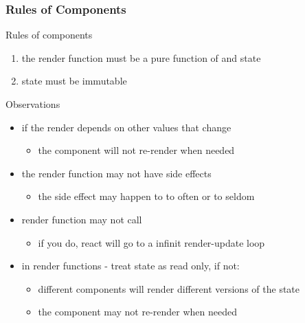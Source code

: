\begin{frame}[fragile] \frametitle{Rules of Components}
Rules of components
\begin{enumerate}
  \item the render function must be a pure function of  and state
  \item state must be immutable
\end{enumerate}

\vspace{5mm}
Observations
\begin{itemize}
  \item if the render depends on other values that change
  \begin{itemize}
    \item the component will not re-render when needed
  \end{itemize}
  \item the render function may not have side effects
  \begin{itemize}
    \item the side effect may happen to to often or to seldom
  \end{itemize}
  \item render function may not call 
  \begin{itemize}
    \item if you do, react will go to a infinit render-update loop
  \end{itemize}
  \item in render functions - treat state as read only, if not:
  \begin{itemize}
    \item different components will render different versions of the state
    \item the component may not re-render when needed
  \end{itemize}
\end{itemize}
\end{frame}

